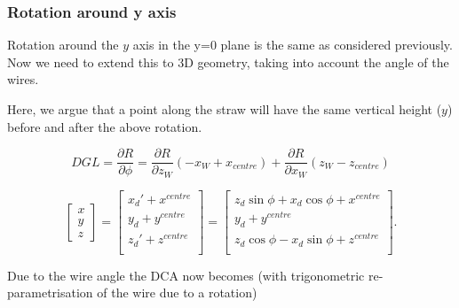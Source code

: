 \documentclass[a4paper,11pt]{article}
\begin{document}
\subsubsection{Rotation around y axis}

Rotation around the $y$ axis in the y=0 plane is the same as considered previously. Now we need to extend this to 3D geometry, taking into account the angle of the wires. 


Here, we argue that a point along the straw will have the same vertical height ($y$) before and after the above rotation.

\begin{equation}
DGL = \frac{ \partial R}{\partial \phi} = \frac{ \partial R}{\partial z_W} (-x_W + x_{centre}) + \frac{ \partial R}{\partial x_W} (z_W - z_{centre})
\end{equation}

\begin{equation}
\begin{bmatrix}x\\y\\z\end{bmatrix}=\begin{bmatrix}x_d'+x^{centre}\\ y_d + y^{centre} \\z_d'+z^{centre}\\\end{bmatrix}=\begin{bmatrix}z_d\sin \phi +x_d\cos \phi + x^{centre} \\ y_d + y^{centre} \\ z_d\cos \phi -x_d\sin \phi + z^{centre} \\\end{bmatrix}. \label{eq:global}
\end{equation}

Due to the wire angle the DCA now becomes (with trigonometric re-parametrisation of the wire due to a rotation)
\end{document}
